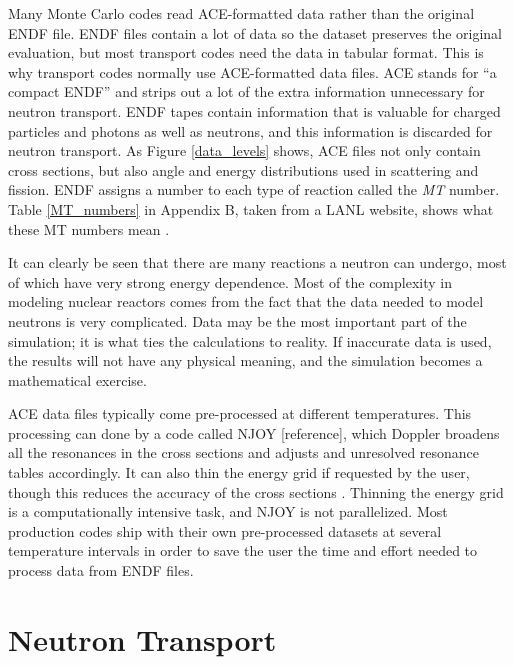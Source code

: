 Many Monte Carlo codes read ACE-formatted data rather than the original ENDF file.  ENDF files contain a lot of data so the dataset preserves the original evaluation, but most transport codes need the data in tabular format.  This is why transport codes normally use ACE-formatted data files. \cite{jaakko}  ACE stands for ``a compact ENDF'' and strips out a lot of the extra information unnecessary for neutron transport.  ENDF tapes contain information that is valuable for charged particles and photons as well as neutrons, and this information is discarded for neutron transport. As Figure \ref{data_levels} shows, ACE files not only contain cross sections, but also angle and energy distributions used in scattering and fission.  ENDF assigns a number to each type of reaction called the \emph{MT} number.  Table \ref{MT_numbers} in Appendix B, taken from a LANL website, shows what these MT numbers mean \cite{endfnums}.  

It can clearly be seen that there are many reactions a neutron can undergo, most of which have very strong energy dependence.  Most of the complexity in modeling nuclear reactors comes from the fact that the data needed to model neutrons is very complicated.  Data may be the most important part of the simulation; it is what ties the calculations to reality.  If inaccurate data is used, the results will not have any physical meaning, and the simulation becomes a mathematical exercise.  

ACE data files typically come pre-processed at different temperatures.  This processing can done by a code called NJOY [reference], which Doppler broadens all the resonances in the cross sections and adjusts and unresolved resonance tables accordingly.  It can also thin the energy grid if requested by the user, though this reduces the accuracy of the cross sections \cite{jaakko}.  Thinning the energy grid is a computationally intensive task, and NJOY is not parallelized.  Most production codes ship with their own pre-processed datasets at several temperature intervals in order to save the user the time and effort needed to process data from ENDF files.


\section{Neutron Transport}

